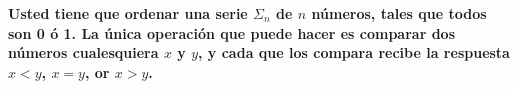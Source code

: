 \textbf{Usted tiene que ordenar una serie $\Sigma_n$ de $n$ números, tales que todos son 0 ó 1. La única operación que puede hacer es comparar dos números cualesquiera $x$ y $y$, y cada que los compara recibe la respuesta $x < y$, $x = y$, or $x > y$.}\vspace{.2cm}